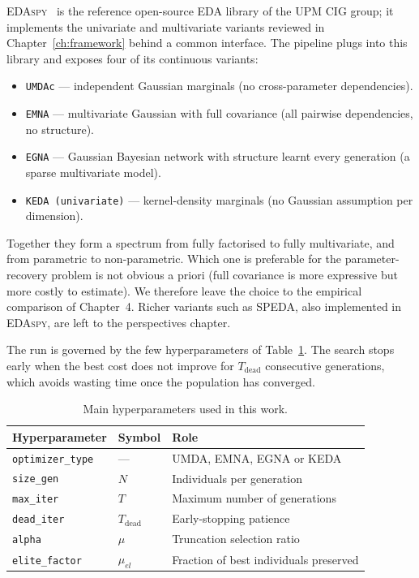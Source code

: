 \textsc{EDAspy}~\cite{soloviev2024edaspy} is the reference open-source
EDA library of the UPM CIG group; it implements the univariate and
multivariate variants reviewed in Chapter~\ref{ch:framework} behind a
common interface. The pipeline plugs into this library and exposes
four of its continuous variants:
\begin{itemize}
  \item \texttt{UMDAc} — independent Gaussian marginals (no
        cross-parameter dependencies).
  \item \texttt{EMNA} — multivariate Gaussian with full covariance
        (all pairwise dependencies, no structure).
  \item \texttt{EGNA} — Gaussian Bayesian network with structure
        learnt every generation (a sparse multivariate model).
  \item \texttt{KEDA (univariate)} — kernel-density marginals (no
        Gaussian assumption per dimension).
\end{itemize}
Together they form a spectrum from fully factorised to fully
multivariate, and from parametric to non-parametric. Which one is
preferable for the parameter-recovery problem is not obvious a priori
(full covariance is more expressive but more costly to estimate). We therefore leave the
choice to the empirical comparison of Chapter~4. Richer variants such
as SPEDA, also implemented in \textsc{EDAspy}, are left to the
perspectives chapter.

The run is governed by the few hyperparameters of
Table~\ref{tab:hyperparams}. The search stops early when the best cost
does not improve for $T_{\text{dead}}$ consecutive generations, which
avoids wasting time once the population has converged.

\begin{table}[h]
\centering\small
\begin{tabular}{lll}
\hline
\textbf{Hyperparameter} & \textbf{Symbol} & \textbf{Role}\\
\hline
\texttt{optimizer\_type} & --- & UMDA, EMNA, EGNA or KEDA\\
\texttt{size\_gen}       & $N$ & Individuals per generation\\
\texttt{max\_iter}       & $T$ & Maximum number of generations\\
\texttt{dead\_iter}      & $T_{\text{dead}}$ & Early-stopping patience\\
\texttt{alpha}           & $\mu$ & Truncation selection ratio\\
\texttt{elite\_factor}   & $\mu_{el}$ & Fraction of best individuals preserved\\
\hline
\end{tabular}
\caption{Main hyperparameters used in this work.}
\label{tab:hyperparams}
\end{table}

